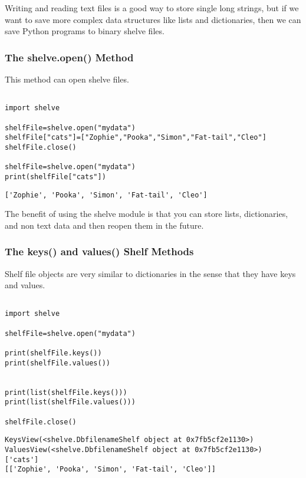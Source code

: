 \documentclass[11pt]{article}
\begin{document}
Writing and reading text files is a good way to store single long strings, but if we want to save more complex data structures like lists and dictionaries, then we can save Python programs to binary shelve files.

\subsubsection{The shelve.open() Method}
\label{sec:org1ff82b6}

This method can open shelve files.

\begin{verbatim}

import shelve

shelfFile=shelve.open("mydata")
shelfFile["cats"]=["Zophie","Pooka","Simon","Fat-tail","Cleo"]
shelfFile.close()

shelfFile=shelve.open("mydata")
print(shelfFile["cats"])

\end{verbatim}

\begin{verbatim}
['Zophie', 'Pooka', 'Simon', 'Fat-tail', 'Cleo']
\end{verbatim}


The benefit of using the shelve module is that you can store lists, dictionaries, and non text data and then reopen them in the future.

\subsubsection{The keys() and values() Shelf Methods}
\label{sec:orge9376d2}

Shelf file objects are very similar to dictionaries in the sense that they have keys and values.

\begin{verbatim}

import shelve

shelfFile=shelve.open("mydata")

print(shelfFile.keys())
print(shelfFile.values())


print(list(shelfFile.keys()))
print(list(shelfFile.values()))

shelfFile.close()
\end{verbatim}

\begin{verbatim}
KeysView(<shelve.DbfilenameShelf object at 0x7fb5cf2e1130>)
ValuesView(<shelve.DbfilenameShelf object at 0x7fb5cf2e1130>)
['cats']
[['Zophie', 'Pooka', 'Simon', 'Fat-tail', 'Cleo']]
\end{verbatim}
\end{document}

